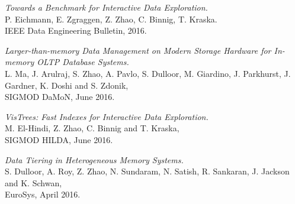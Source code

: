 \documentclass[letterpaper]{article}
\renewenvironment{itemize}{
  \begin{list}{}{
    \setlength{\leftmargin}{1.5em}
  }
}{
  \end{list}
}
\begin{document}
\begin{itemize}
\item \textit{Towards a Benchmark for Interactive Data Exploration.} \\
  P. Eichmann, E. Zgraggen, Z. Zhao, C. Binnig, T. Kraska. \\
   IEEE Data Engineering Bulletin, 2016.

\item \textit{Larger-than-memory Data Management on Modern Storage Hardware for In-memory OLTP Database Systems.} \\
  L. Ma, J. Arulraj, S. Zhao, A. Pavlo, S. Dulloor, M. Giardino, J. Parkhurst, J. Gardner, K. Doshi and S. Zdonik, \\
  SIGMOD DaMoN, June 2016.

\item \textit{VisTrees: Fast Indexes for Interactive Data Exploration.} \\
  M. El-Hindi, Z. Zhao, C. Binnig and T. Kraska, \\
  SIGMOD HILDA, June 2016.

\item \textit{Data Tiering in Heterogeneous Memory Systems.} \\
  S. Dulloor, A. Roy, Z. Zhao, N. Sundaram, N. Satish, R. Sankaran, J. Jackson and K. Schwan, \\
  EuroSys, April 2016.

\end{itemize}
\end{document}
